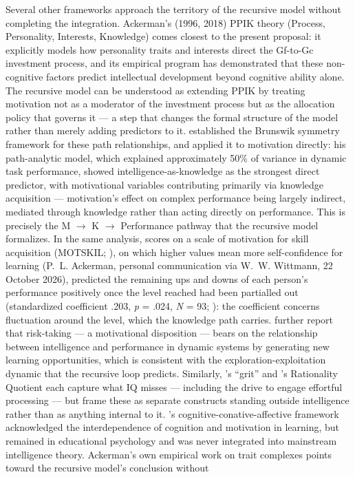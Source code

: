 \documentclass[12pt,a4paper]{article}
\begin{document}
Several other frameworks approach the territory of the recursive model without completing the integration. Ackerman's (1996, 2018) PPIK theory (Process, Personality, Interests, Knowledge) comes closest to the present proposal: it explicitly models how personality traits and interests direct the Gf-to-Gc investment process, and its empirical program has demonstrated that these non-cognitive factors predict intellectual development beyond cognitive ability alone. The recursive model can be understood as extending PPIK by treating motivation not as a moderator of the investment process but as the allocation policy that governs it ---\hspace{0pt} a step that changes the formal structure of the model rather than merely adding predictors to it. \citet{WittmannSuss1999} established the Brunswik symmetry framework for these path relationships, and \citet{Wittmann2002} applied it to motivation directly: his path-analytic model, which explained approximately 50\% of variance in dynamic task performance, showed intelligence-as-knowledge as the strongest direct predictor, with motivational variables contributing primarily via knowledge acquisition ---\hspace{0pt} motivation's effect on complex performance being largely indirect, mediated through knowledge rather than acting directly on performance. This is precisely the M $\rightarrow$ K $\rightarrow$ Performance pathway that the recursive model formalizes. In the same analysis, scores on a scale of motivation for skill acquisition (MOTSKIL; \citealp[p.~276]{AckermanKanferGoff1995}), on which higher values mean more self-confidence for learning (P.~L. Ackerman, personal communication via W.~W. Wittmann, 22 October 2026), predicted the remaining ups and downs of each person's performance positively once the level reached had been partialled out (standardized coefficient .203, \textit{p} = .024, \textit{N} = 93; \citealp[Fig.~11]{Wittmann2002}): the coefficient concerns fluctuation around the level, which the knowledge path carries. \citet{WittmannHattrup2004} further report that risk-taking ---\hspace{0pt} a motivational disposition ---\hspace{0pt} bears on the relationship between intelligence and performance in dynamic systems by generating new learning opportunities, which is consistent with the exploration-exploitation dynamic that the recursive loop predicts. Similarly, \citeauthor{Duckworth2007}'s \citeyearpar{Duckworth2007} ``grit'' and \citeauthor{Stanovich2016}'s \citeyearpar{Stanovich2016} Rationality Quotient each capture what IQ misses ---\hspace{0pt} including the drive to engage effortful processing ---\hspace{0pt} but frame these as separate constructs standing outside intelligence rather than as anything internal to it. \citeauthor{Snow1996}'s \citeyearpar{Snow1996} cognitive-conative-affective framework acknowledged the interdependence of cognition and motivation in learning, but remained in educational psychology and was never integrated into mainstream intelligence theory. Ackerman's own empirical work on trait complexes points toward the recursive model's conclusion without 
\end{document}
